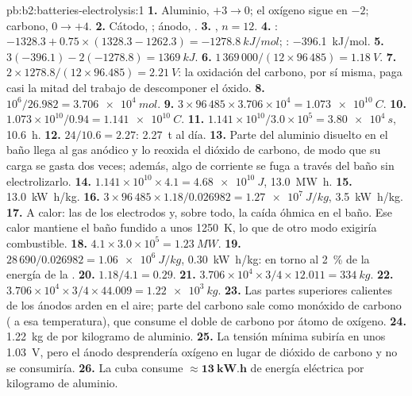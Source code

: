 \begin{solution}{pb:b2:batteries-electrolysis:1}
\textbf{1.} Aluminio, $+3 \to 0$; el oxígeno sigue en $-2$; carbono, $0 \to +4$.
\textbf{2.} Cátodo, ; ánodo, .
\textbf{3.} , $n = 12$.
\textbf{4.} : $-1328.3 + 0.75 \times (1328.3 - 1262.3) = \qty{-1278.8}{kJ/mol}$;
: \qty{-396.1}{kJ/mol}.
\textbf{5.} $3(-396.1) - 2(-1278.8) = \qty{+1369}{kJ}$.
\textbf{6.} $1\,369\,000/(12 \times 96\,485) = \qty{1.18}{V}$.
\textbf{7.} $2 \times 1278.8/(12 \times 96.485) = \qty{2.21}{V}$: la oxidación del carbono,
 por sí misma, paga casi la mitad del trabajo de descomponer el óxido.
\textbf{8.} $10^6/26.982 = \qty{3.706e4}{mol}$.
\textbf{9.} $3 \times 96\,485 \times 3.706 \times 10^4 = \qty{1.073e10}{C}$.
\textbf{10.} $1.073 \times 10^{10}/0.94 = \qty{1.141e10}{C}$.
\textbf{11.} $1.141 \times 10^{10}/3.0 \times 10^5 = \qty{3.80e4}{s}$, \qty{10.6}{h}.
\textbf{12.} $24/10.6 = 2.27$: \qty{2.27}{t} al día.
\textbf{13.} Parte del aluminio disuelto en el baño llega al gas anódico y
lo reoxida el dióxido de carbono, de modo que su carga se gasta dos veces; además, algo de corriente
se fuga a través del baño sin electrolizarlo.
\textbf{14.} $1.141 \times 10^{10} \times 4.1 = \qty{4.68e10}{J}$, \qty{13.0}{MW.h}.
\textbf{15.} \qty{13.0}{kW.h/kg}.
\textbf{16.} $3 \times 96\,485 \times 1.18/0.026982 = \qty{1.27e7}{J/kg}$, \qty{3.5}{kW.h/kg}.
\textbf{17.} A calor: las  de los electrodos y, sobre todo, la
caída óhmica en el baño. Ese calor mantiene el baño fundido a unos
\qty{1250}{K}, lo que de otro modo exigiría combustible.
\textbf{18.} $4.1 \times 3.0 \times 10^5 = \qty{1.23}{MW}$.
\textbf{19.} $28\,690/0.026982 = \qty{1.06e6}{J/kg}$, \qty{0.30}{kW.h/kg}: en torno al 2~\% de
la energía de la .
\textbf{20.} $1.18/4.1 = 0.29$.
\textbf{21.} $3.706 \times 10^4 \times 3/4 \times 12.011 = \qty{334}{kg}$.
\textbf{22.} $3.706 \times 10^4 \times 3/4 \times 44.009 = \qty{1.22e3}{kg}$.
\textbf{23.} Las partes superiores calientes de los ánodos arden en el aire; parte del carbono sale
como monóxido de carbono ( a esa temperatura), que consume el doble de
carbono por átomo de oxígeno.
\textbf{24.} \qty{1.22}{kg} de  por kilogramo de aluminio.
\textbf{25.} La tensión mínima subiría en unos \qty{1.03}{V}, pero el ánodo
desprendería oxígeno en lugar de dióxido de carbono y no se consumiría.
\textbf{26.} La cuba consume $\boldsymbol{\approx \qty{13}{kW.h}}$ de energía
eléctrica por kilogramo de aluminio.
\end{solution}

